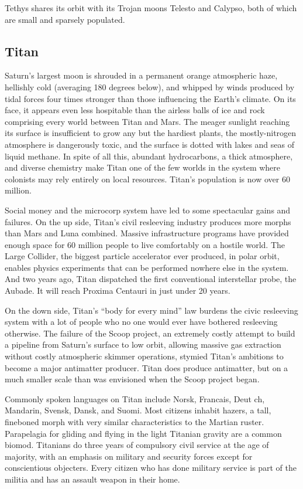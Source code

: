 Tethys shares its orbit with its Trojan moons Telesto and Calypso, both of which are small and sparsely populated. 

\subsection{Titan} \label{sec:titan} 

Saturn's largest moon is shrouded in a permanent orange atmospheric haze, hellishly cold (averaging 180 degrees below), and whipped by winds produced by tidal forces four times stronger than those influencing the Earth's climate. On its face, it appears even less hospitable than the airless balls of ice and rock comprising every world between Titan and Mars. The meager sunlight reaching its surface is insufficient to grow any but the hardiest plants, the mostly-nitrogen atmosphere is dangerously toxic, and the surface is dotted with lakes and seas of liquid methane. In spite of all this, abundant hydrocarbons, a thick atmosphere, and diverse chemistry make Titan one of the few worlds in the system where colonists may rely entirely on local resources. Titan's population is now over 60 million. 

Social money and the microcorp system have led to some spectacular gains and failures. On the up side, Titan's civil resleeving industry produces more morphs than Mars and Luna combined. Massive infrastructure programs have provided enough space for 60 million people to live comfortably on a hostile world. The Large Collider, the biggest particle accelerator ever produced, in polar orbit, enables physics experiments that can be performed nowhere else in the system. And two years ago, Titan dispatched the first conventional interstellar probe, the Aubade. It will reach Proxima Centauri in just under 20 years. 

On the down side, Titan's “body for every mind” law burdens the civic resleeving system with a lot of people who no one would ever have bothered resleeving otherwise. The failure of the Scoop project, an extremely costly attempt to build a pipeline from Saturn's surface to low orbit, allowing massive gas extraction without costly atmospheric skimmer operations, stymied Titan's ambitions to become a major antimatter producer. Titan does produce antimatter, but on a much smaller scale than was envisioned when the Scoop project began. 

Commonly spoken languages on Titan include Norsk, Francais, Deut ch, Mandarin, Svensk, Dansk, and Suomi. Most citizens inhabit hazers, a tall, fineboned morph with very similar characteristics to the Martian ruster. Parapelagia for gliding and flying in the light Titanian gravity are a common biomod. Titanians do three years of compulsory civil service at the age of majority, with an emphasis on military and security forces except for conscientious objecters. Every citizen who has done military service is part of the militia and has an assault weapon in their home. 

